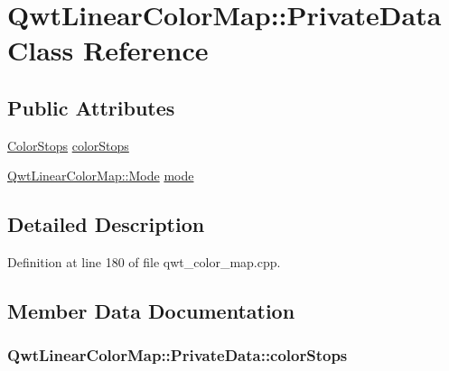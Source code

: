\hypertarget{class_qwt_linear_color_map_1_1_private_data}{\section{Qwt\-Linear\-Color\-Map\-:\-:Private\-Data Class Reference}
\label{class_qwt_linear_color_map_1_1_private_data}
}
\subsection*{Public Attributes}
\begin{DoxyCompactItemize}
\item 
\hyperlink{class_qwt_linear_color_map_1_1_color_stops}{Color\-Stops} \hyperlink{class_qwt_linear_color_map_1_1_private_data_ab71fa02fdf5923bce90e04b09611b100}{color\-Stops}
\item 
\hyperlink{class_qwt_linear_color_map_ac8c5f1991f533b1d25a9a0a0874b7d54}{Qwt\-Linear\-Color\-Map\-::\-Mode} \hyperlink{class_qwt_linear_color_map_1_1_private_data_a2bfd4a288590f250b78a085b64468fba}{mode}
\end{DoxyCompactItemize}


\subsection{Detailed Description}


Definition at line 180 of file qwt\-\_\-color\-\_\-map.\-cpp.



\subsection{Member Data Documentation}
\hypertarget{class_qwt_linear_color_map_1_1_private_data_ab71fa02fdf5923bce90e04b09611b100}{
\subsubsection[{color\-Stops}]{ Qwt\-Linear\-Color\-Map\-::\-Private\-Data\-::color\-Stops}}\label{class_qwt_linear_color_map_1_1_private_data_ab71fa02fdf5923bce90e04b09611b100}


